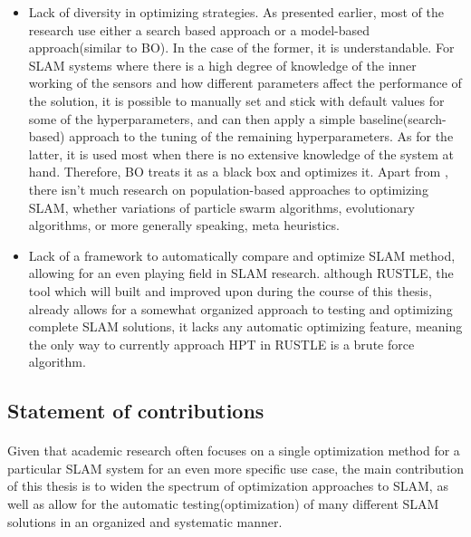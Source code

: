 \begin{itemize}
    \item Lack of diversity in optimizing strategies. As presented earlier, most of the research use either a search based approach or a model-based approach(similar to \ac{BO}). In the case of the former, it is understandable. For \ac{SLAM} systems where there is a high degree of knowledge of the inner working of the sensors and how different parameters affect the performance of the solution, it is possible to manually set and stick with default values for some of the hyperparameters, and can then apply a simple baseline(search-based) approach to the tuning of the remaining hyperparameters. As for the latter, it is used most when there is no extensive knowledge of the system at hand. Therefore, \ac{BO} treats it as a black box and optimizes it. Apart from \cite{kostusiak2019efficiency}, there isn't much research on population-based approaches to optimizing \ac{SLAM}, whether variations of particle swarm algorithms, evolutionary algorithms, or more generally speaking, meta heuristics.
    \item Lack of a framework to automatically compare and optimize \ac{SLAM} method, allowing for an even playing field in \ac{SLAM} research. although RUSTLE, the tool which will built and improved upon during the course of this thesis, already allows for a somewhat organized approach to testing and optimizing complete \ac{SLAM} solutions, it lacks any automatic optimizing feature, meaning the only way to currently approach \ac{HPT} in RUSTLE is a brute force algorithm.
\end{itemize}

\subsection{Statement of contributions}
\paragraph{}Given that academic research often focuses on a single optimization method for a particular \ac{SLAM} system for an even more specific use case, the main contribution of this thesis is to widen the spectrum of optimization approaches to \ac{SLAM}, as well as allow for the automatic testing(optimization) of many different \ac{SLAM} solutions in an organized and systematic manner.